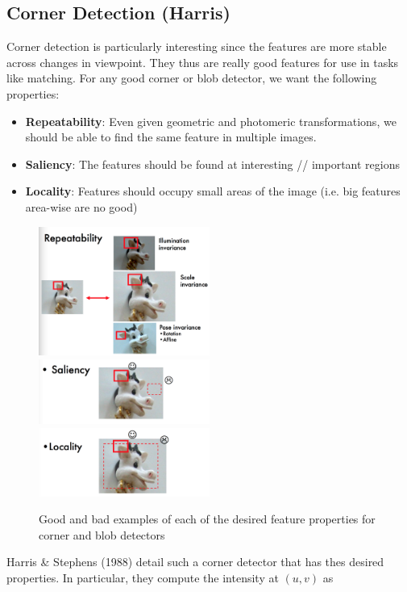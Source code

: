 \documentclass[a4paper, 12pt]{article}
\numberwithin{equation}{section}
\begin{document}
\subsection{Corner Detection (Harris)} 
Corner detection is particularly interesting since the features are more stable across changes in viewpoint. They thus are really good features for use in tasks like matching. For any good corner or blob detector, we want the following properties:
\begin{itemize}
\item \textbf{Repeatability}: Even given geometric and photomeric transformations, we should be able to find the same feature in multiple images.
\item \textbf{Saliency}: The features should be found at interesting // important regions
\item \textbf{Locality}: Features should occupy small areas of the image (i.e. big features area-wise are no good)
\end{itemize}
\begin{figure}
\centering
\includegraphics[width=0.5\textwidth]{repeat}
\includegraphics[width=0.5\textwidth]{salient}
\includegraphics[width=0.5\textwidth]{local}
\caption{Good and bad examples of each of the desired feature properties for corner and blob detectors}
\end{figure}
Harris \& Stephens (1988) detail such a corner detector that has thes desired properties. In particular, they compute the intensity at $(u,v)$ as
\end{document}

